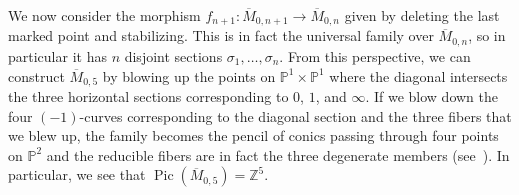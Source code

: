 \documentclass{amsart}
\theoremstyle{definition}
\theoremstyle{remark}
\theoremstyle{plain}
\theoremstyle{definition}
\theoremstyle{remark}
\newcommand{\Z}{\mathbb{Z}}
\renewcommand{\P}{\mathbb{P}}
\newcommand{\ol}[1]{\overline{#1}}
\newcommand{\1}{\mathbf{1}}
\newcommand{\2}{\mathbf{2}}
\newcommand{\3}{\mathbf{3}}
\DeclareMathOperator{\Pic}{Pic}
\begin{document}
We now consider the morphism \(f_{n+1} \colon \ol{M}_{0, n+1} \to \ol{M}_{0, n}\) given by deleting the last marked point and stabilizing. This is in fact the universal family over \(\ol{M}_{0, n}\), so in particular it has \(n\) disjoint sections \(\sigma_1, \ldots, \sigma_n\). From this perspective, we can construct \(\ol{M}_{0, 5}\) by blowing up the points on \(\P^1 \times \P^1\) where the diagonal intersects the three horizontal sections corresponding to \(0\), \(1\), and \(\infty\). If we blow down the four \((-1)\)-curves corresponding to the diagonal section and the three fibers that we blew up, the family becomes the pencil of conics passing through four points on \(\P^2\) and the reducible fibers are in fact the three degenerate members (see~). In particular, we see that \(\Pic(\ol{M}_{0,5}) = \Z^5\).
\end{document}
